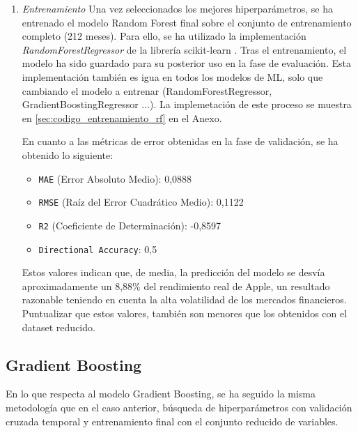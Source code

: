 \begin{enumerate}
    \item \emph{Entrenamiento}
    Una vez seleccionados los mejores hiperparámetros, se ha entrenado el modelo Random Forest final sobre el conjunto de entrenamiento completo (212 meses). Para ello, se ha utilizado la implementación \emph{RandomForestRegressor} de la librería scikit-learn \cite{scikit_rf}. Tras el entrenamiento, el modelo ha sido guardado para su posterior uso en la fase de evaluación. Esta implementación también es igua en todos los modelos de ML, solo que cambiando el modelo a entrenar (RandomForestRegressor, GradientBoostingRegressor ...). La implemetación de este proceso se muestra en \ref{sec:codigo_entrenamiento_rf} en el Anexo.

    En cuanto a las métricas de error obtenidas en la fase de validación, se ha obtenido lo siguiente:

    \begin{itemize}
        \item \texttt{MAE} (Error Absoluto Medio): 0,0888
        \item \texttt{RMSE} (Raíz del Error Cuadrático Medio): 0,1122
        \item \texttt{R2} (Coeficiente de Determinación): -0,8597
        \item \texttt{Directional Accuracy}: 0,5
    \end{itemize}

    Estos valores indican que, de media, la predicción del modelo se desvía aproximadamente un 8,88\% del rendimiento real de Apple, un resultado razonable teniendo en cuenta la alta volatilidad de los mercados financieros. Puntualizar que estos valores, también son menores que los obtenidos con el dataset reducido.
\end{enumerate}

\subsection{Gradient Boosting}
En lo que respecta al modelo Gradient Boosting, se ha seguido la misma metodología que en el caso anterior, búsqueda de hiperparámetros con validación cruzada temporal y entrenamiento final con el conjunto reducido de variables.

